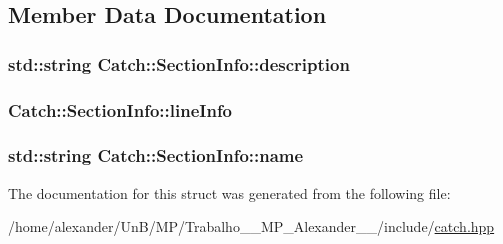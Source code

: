 \subsection{Member Data Documentation}
\hypertarget{structCatch_1_1SectionInfo_a0052060219a6de74bb7ade34d4163a4e}{
\subsubsection[{description}]{\setlength{\rightskip}{0pt plus 5cm}std\-::string Catch\-::\-Section\-Info\-::description}}\label{structCatch_1_1SectionInfo_a0052060219a6de74bb7ade34d4163a4e}
\hypertarget{structCatch_1_1SectionInfo_adbc83b8a3507c4acc8ee249e93465711}{
\subsubsection[{line\-Info}]{ Catch\-::\-Section\-Info\-::line\-Info}}\label{structCatch_1_1SectionInfo_adbc83b8a3507c4acc8ee249e93465711}
\hypertarget{structCatch_1_1SectionInfo_a704c8fc662d309137e0d4f199cb7df58}{
\subsubsection[{name}]{\setlength{\rightskip}{0pt plus 5cm}std\-::string Catch\-::\-Section\-Info\-::name}}\label{structCatch_1_1SectionInfo_a704c8fc662d309137e0d4f199cb7df58}


The documentation for this struct was generated from the following file\-:\begin{DoxyCompactItemize}
\item 
/home/alexander/\-Un\-B/\-M\-P/\-Trabalho\-\_\-\_\-\-M\-P\-\_\-\-Alexander\-\_\-\_/include/\hyperlink{catch_8hpp}{catch.\-hpp}\end{DoxyCompactItemize}
